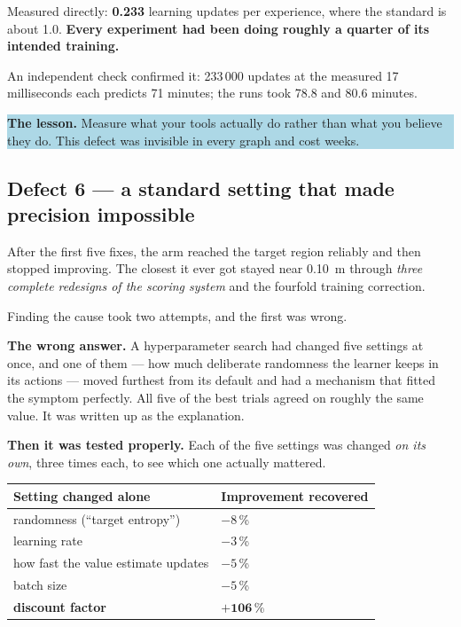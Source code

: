 \documentclass[11pt, a4paper]{article}
\newcommand{\lesson}[1]{%
  \par\vspace{4pt}%
  \noindent\colorbox{lightblue}{\parbox{\dimexpr\linewidth-2\fboxsep}{%
  \textbf{The lesson.} #1}}\par\vspace{4pt}}
\begin{document}
Measured directly: \textbf{0.233} learning updates per experience, where the
standard is about 1.0. \textbf{Every experiment had been doing roughly a quarter
of its intended training.}

An independent check confirmed it: 233\,000 updates at the measured 17
milliseconds each predicts 71 minutes; the runs took 78.8 and 80.6 minutes.

\lesson{Measure what your tools actually do rather than what you believe they do.
This defect was invisible in every graph and cost weeks.}

\subsection{Defect 6 --- a standard setting that made precision impossible}

After the first five fixes, the arm reached the target region reliably and then
stopped improving. The closest it ever got stayed near \SI{0.10}{\meter} through
\emph{three complete redesigns of the scoring system} and the fourfold training
correction.

Finding the cause took two attempts, and the first was wrong.

\textbf{The wrong answer.} A hyperparameter search had changed five settings at
once, and one of them --- how much deliberate randomness the learner keeps in its
actions --- moved furthest from its default and had a mechanism that fitted the
symptom perfectly. All five of the best trials agreed on roughly the same value.
It was written up as the explanation.

\textbf{Then it was tested properly.} Each of the five settings was changed
\emph{on its own}, three times each, to see which one actually mattered.

\begin{center}
\begin{tabular}{@{} L{6.0cm} C{3.6cm} @{}}
\toprule
\textbf{Setting changed alone} & \textbf{Improvement recovered} \\
\midrule
randomness (``target entropy'') & $-8$\,\% \\
learning rate & $-3$\,\% \\
how fast the value estimate updates & $-5$\,\% \\
batch size & $-5$\,\% \\
\textbf{discount factor} & $\mathbf{+106}$\,\% \\
\bottomrule
\end{tabular}
\end{center}
\end{document}

